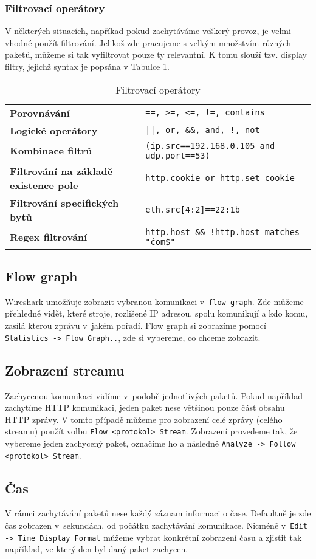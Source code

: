 \subsubsection{Filtrovací operátory}
V některých situacích, napříkad pokud zachytáváme veškerý provoz, je velmi vhodné použít filtrování. Jelikož zde pracujeme s velkým množstvím různých paketů, můžeme si tak vyfiltrovat pouze ty relevantní. K tomu slouží tzv. display filtry, jejichž syntax je popsána v Tabulce 1.
\begin{center}
\begin{table}[h]
\centering
\def\arraystretch{1.2}
\begin{tabular}{|l|l|}
\hline
\textbf{Porovnávání} & \texttt{==, >=, <=, !=, contains}\\
\textbf{Logické operátory} & \texttt{||, or, \&\&, and, !, not}\\
\textbf{Kombinace filtrů} & \texttt{(ip.src==192.168.0.105 and udp.port==53)}\\
\textbf{Filtrování na základě existence pole} & \texttt{http.cookie or http.set\_cookie}\\
\textbf{Filtrování specifických bytů} & \texttt{eth.src[4:2]==22:1b}\\
\textbf{Regex filtrování} & \texttt{http.host \&\& !http.host matches "\.com\$"}\\
\hline
\end{tabular}
\caption{Filtrovací operátory}
\end{table}
\end{center}


\subsection{Flow graph}
Wireshark umožňuje zobrazit vybranou komunikaci v~\texttt{flow graph}. Zde můžeme přehledně vidět, které stroje, rozlišené IP adresou, spolu komunikují a kdo komu, zasílá kterou zprávu v~jakém pořadí.
Flow graph si zobrazíme pomocí \texttt{Statistics -> Flow Graph..}, zde si vybereme, co chceme zobrazit.
\subsection{Zobrazení streamu}
Zachycenou komunikaci vidíme v~podobě jednotlivých paketů. Pokud například zachytíme HTTP komunikaci, jeden paket nese většinou pouze část obsahu HTTP zprávy. V tomto případě můžeme pro zobrazení celé zprávy (celého streamu) použít volbu \texttt{Flow <protokol> Stream}. Zobrazení provedeme tak, že vybereme jeden zachycený paket, označíme ho a následně \texttt{Analyze -> Follow <protokol> Stream}.
\subsection{Čas}
V rámci zachytávání paketů nese každý záznam informaci o čase. Defaultně je zde čas zobrazen v~sekundách, od počátku zachytávání komunikace. Nicméně v~\texttt{Edit -> Time Display Format} můžeme vybrat konkrétní zobrazení času a zjistit tak například, ve který den byl daný paket zachycen.
